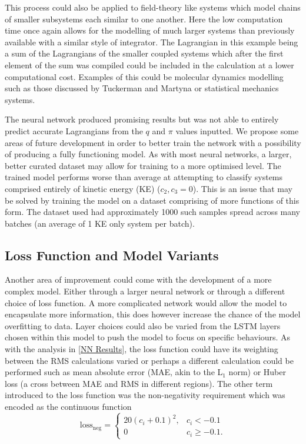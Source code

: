 \documentclass[10pt]{iopart}
\begin{document}
This process could also be applied to field-theory like systems which model chains of smaller subsystems each similar to one another. Here the low computation time once again allows for the modelling of much larger systems than previously available with a similar style of integrator. The Lagrangian in this example being a sum of the Lagrangians of the smaller coupled systems which after the first element of the sum was compiled could be included in the calculation at a lower computational cost. Examples of this could be molecular dynamics modelling such as those discussed by Tuckerman and Martyna \cite{MolecularDynamics} or statistical mechanics systems. 

The neural network produced promising results but was not able to entirely predict accurate Lagrangians from the $q$ and $\pi$ values inputted. We propose some areas of future development in order to better train the network with a possibility of producing a fully functioning model. As with most neural networks, a larger, better curated dataset may allow for training to a more optimised level. The trained model performs worse than average at attempting to classify systems comprised entirely of kinetic energy (KE) ($c_2,c_3 = 0$). This is an issue that may be solved by training the model on a dataset comprising of more functions of this form. The dataset used had approximately 1000 such samples spread across many batches (an average of 1 KE only system per batch). 

\subsection{Loss Function and Model Variants}

Another area of improvement could come with the development of a more complex model. Either through a larger neural network or through a different choice of loss function. A more complicated network would allow the model to encapsulate more information, this does however increase the chance of the model overfitting to data. Layer choices could also be varied from the LSTM layers chosen within this model to push the model to focus on specific behaviours.  As with the analysis in \ref{NN Results}, the loss function could have its weighting between the RMS calculations varied or perhaps a different calculation could be performed such as mean absolute error (MAE, akin to the L$_1$ norm) or Huber loss (a cross between MAE and RMS in different regions). 
The other term introduced to the loss function was the non-negativity requirement which was encoded as the continuous function 
\begin{equation}
	\label{nonnegLoss}
	\textrm{loss}_{\textrm{neg}} = 
	\begin{cases}
		20(c_i + 0.1)^2, &c_i<-0.1\\
		0 &c_i \geq -0.1.
	\end{cases}
\end{equation}
\end{document}
